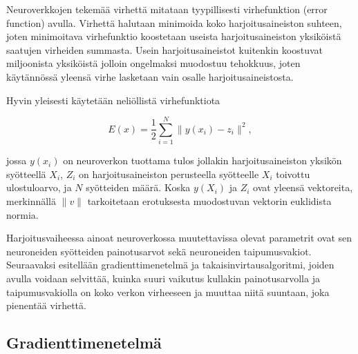 \documentclass[finnish]{tktltiki2}
\theoremstyle{definition}
\theoremstyle{remark}
\begin{document}
  Neuroverkkojen tekemää virhettä mitataan tyypillisesti virhefunktion (error function) avulla. Virhettä halutaan minimoida koko harjoitusaineiston suhteen, joten minimoitava virhefunktio koostetaan useista harjoitusaineiston yksiköistä saatujen virheiden summasta. Usein harjoitusaineistot kuitenkin koostuvat miljoonista yksiköistä jolloin ongelmaksi muodostuu tehokkuus, joten käytännössä yleensä virhe lasketaan vain osalle harjoitusaineistosta.

   Hyvin yleisesti käytetään neliöllistä virhefunktiota

  \begin{equation}
    E(x) = \frac{1}{2} \sum_{i=1}^{N} \| y(x_i) - z_i \|^2,
    \label{eq:error-function}
  \end{equation}

  jossa $y(x_i)$ on neuroverkon tuottama tulos jollakin harjoitusaineiston yksikön syötteellä $X_i$, $Z_i$ on harjoitusaineiston perusteella syötteelle $X_i$ toivottu ulostuloarvo, ja $N$ syötteiden määrä. Koska $y(X_i)$ ja $Z_i$ ovat yleensä vektoreita, merkinnällä $\|v\|$ tarkoitetaan erotuksesta muodostuvan vektorin euklidista normia.

  Harjoitusvaiheessa ainoat neuroverkossa muutettavissa olevat parametrit ovat sen neuroneiden syötteiden painotusarvot sekä neuroneiden taipumusvakiot. Seuraavaksi esitellään gradienttimenetelmä ja takaisinvirtausalgoritmi, joiden avulla voidaan selvittää, kuinka suuri vaikutus kullakin painotusarvolla ja taipumusvakiolla on koko verkon virheeseen ja muuttaa niitä suuntaan, joka pienentää virhettä.



  \subsection{Gradienttimenetelmä}
    \label{chap:backprop}
\end{document}
